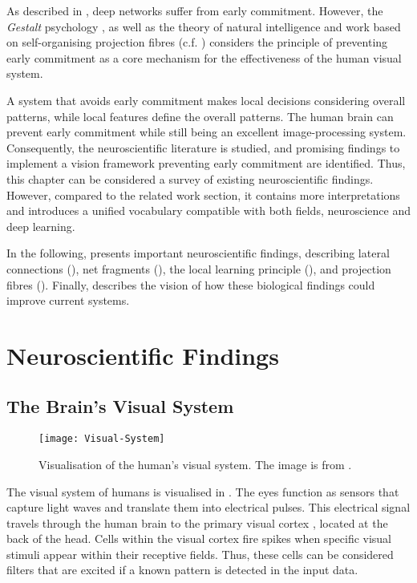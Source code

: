 As described in , deep networks suffer from early commitment.
However, the \emph{Gestalt} psychology , as well as the theory of natural intelligence  and work based on self-organising projection fibres (c.f. ) considers the principle of preventing early commitment as a core mechanism for the effectiveness of the human visual system.

A system that avoids early commitment makes local decisions considering overall patterns, while local features define the overall patterns.
The human brain can prevent early commitment while still being an excellent image-processing system. 
Consequently, the neuroscientific literature is studied, and promising findings to implement a vision framework preventing early commitment are identified.
Thus, this chapter can be considered a survey of existing neuroscientific findings.
However, compared to the related work section, it contains more interpretations and introduces a unified vocabulary compatible with both fields, neuroscience and deep learning.

In the following,  presents important neuroscientific findings, describing lateral connections (), net fragments (), the local learning principle (), and projection fibres ().
Finally,  describes the vision of how these biological findings could improve current systems.



\section{Neuroscientific Findings}

\subsection{The Brain's Visual System}
\begin{figure}[h]
    \centering
    \texttt{[image: Visual-System]}
    \caption[Visualisation of the human's visual system]{Visualisation of the human's visual system. The image is from .}
\end{figure}
%
The visual system of humans is visualised in . The eyes function as sensors that capture light waves and translate them into electrical pulses. This electrical signal travels through the human brain to the primary visual cortex , located at the back of the head.
Cells within the visual cortex fire spikes when specific visual stimuli appear within their receptive fields. Thus, these cells can be considered filters that are excited if a known pattern is detected in the input data. 

